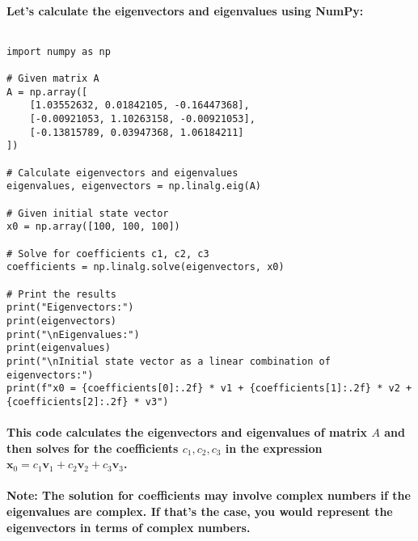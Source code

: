 \paragraph{Let's calculate the eigenvectors and eigenvalues using NumPy:}
% 
$$$$
% 
\begin{lstlisting}[style=pystyle]
import numpy as np

# Given matrix A
A = np.array([
    [1.03552632, 0.01842105, -0.16447368],
    [-0.00921053, 1.10263158, -0.00921053],
    [-0.13815789, 0.03947368, 1.06184211]
])

# Calculate eigenvectors and eigenvalues
eigenvalues, eigenvectors = np.linalg.eig(A)

# Given initial state vector
x0 = np.array([100, 100, 100])

# Solve for coefficients c1, c2, c3
coefficients = np.linalg.solve(eigenvectors, x0)

# Print the results
print("Eigenvectors:")
print(eigenvectors)
print("\nEigenvalues:")
print(eigenvalues)
print("\nInitial state vector as a linear combination of eigenvectors:")
print(f"x0 = {coefficients[0]:.2f} * v1 + {coefficients[1]:.2f} * v2 + {coefficients[2]:.2f} * v3")
\end{lstlisting}
% 
\paragraph{This code calculates the eigenvectors and eigenvalues of matrix \(A\) and then solves for the coefficients \(c_1, c_2, c_3\) in the expression \(\mathbf{x}_0 = c_1 \mathbf{v}_1 + c_2 \mathbf{v}_2 + c_3 \mathbf{v}_3\).}
% 
\paragraph{Note: The solution for coefficients may involve complex numbers if the eigenvalues are complex. If that's the case, you would represent the eigenvectors in terms of complex numbers.}



